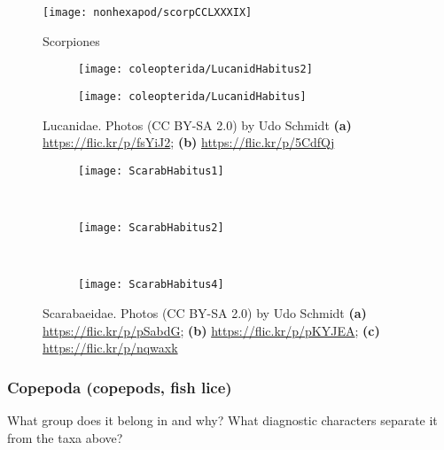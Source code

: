 
\begin{figure}[ht!]
  \centering
    \texttt{[image: nonhexapod/scorpCCLXXXIX]}
  \caption{Scorpiones \cite[][Plate CCLXXXIX]{bhlitem55834arach}}
  \label{fig:scorpion}
\end{figure}

\begin{figure}[ht!]
  \centering
\begin{subfigure}[ht!]{0.42\textwidth}
    \texttt{[image: coleopterida/LucanidHabitus2]}
  \caption{}
  \label{fig:lucanid1}%
\end{subfigure}
    \qquad
\begin{subfigure}[ht!]{0.47\textwidth}
    \texttt{[image: coleopterida/LucanidHabitus]}
  \caption{}
  \label{fig:lucanid}\end{subfigure}%
    \caption{Lucanidae. Photos (CC BY-SA 2.0) by Udo Schmidt \textbf{(a)}  \url{https://flic.kr/p/fsYiJ2}; \textbf{(b)} \url{https://flic.kr/p/5CdfQj}}\label{fig:lucanids}
\end{figure}



\begin{figure}[ht!]
  \centering
\begin{subfigure}[ht!]{0.25\textwidth}
    \texttt{[image: ScarabHabitus1]}
  \caption{}
  \label{fig:scarabaeid1}
\end{subfigure}
    ~
\begin{subfigure}[ht!]{0.25\textwidth}
    \texttt{[image: ScarabHabitus2]}
  \caption{}
  \label{fig:scarabaeid2}
\end{subfigure}
    ~
\begin{subfigure}[ht!]{0.23\textwidth}
    \texttt{[image: ScarabHabitus4]}
  \caption{}
  \label{fig:scarabaeid3}
\end{subfigure}
    \caption{Scarabaeidae. Photos (CC BY-SA 2.0) by Udo Schmidt \textbf{(a)}  \url{https://flic.kr/p/pSabdG}; \textbf{(b)} \url{https://flic.kr/p/pKYJEA}; \textbf{(c)}  \url{https://flic.kr/p/nqwaxk}}\label{fig:scarabaeids}
\end{figure}%



\subsubsection*{Copepoda (copepods, fish lice)}
What group does it belong in and why? What diagnostic characters separate it from the taxa above?\\

